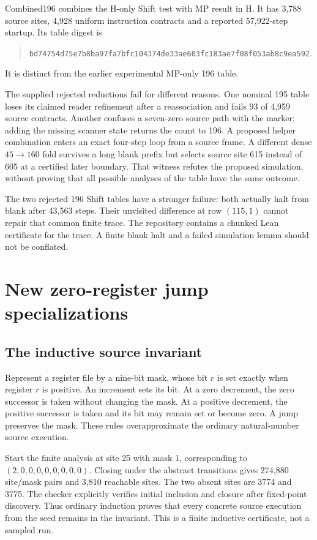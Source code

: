 \documentclass[11pt,a4paper]{article}
\begin{document}
Combined196 combines the H-only Shift test with MP result in H. It has
3,788 source sites, 4,928 uniform instruction contracts and a reported
57,922-step startup. Its table digest is
\begin{quote}\small
\nolinkurl{bd74754d75e7b8ba97fa7bfc104374de33ae603fc183ae7f08f053ab8c9ea592}.
\end{quote}
It is distinct from the earlier experimental MP-only 196 table.

The supplied rejected reductions fail for different reasons. One nominal
195 table loses its claimed reader refinement after a reassociation and
fails 93 of 4,959 source contracts. Another confuses a seven-zero source
path with the marker; adding the missing scanner state returns the count
to 196. A proposed helper combination enters an exact four-step loop from
a source frame. A different dense $45\to160$ fold survives a long blank
prefix but selects source site 615 instead of 605 at a certified later
boundary. That witness refutes the proposed simulation, without proving
that all possible analyses of the table have the same outcome.

The two rejected 196 Shift tables have a stronger failure: both actually
halt from blank after 43,563 steps. Their unvisited difference at row
$(115,1)$ cannot repair that common finite trace. The repository contains
a chunked Lean certificate for the trace. A finite blank halt and a failed
simulation lemma should not be conflated.

\section{New zero-register jump specializations}
\label{sec:jumps}

\subsection{The inductive source invariant}

Represent a register file by a nine-bit mask, whose bit $r$ is set exactly
when register $r$ is positive. An increment sets its bit. At a zero
decrement, the zero successor is taken without changing the mask. At a
positive decrement, the positive successor is taken and its bit may remain
set or become zero. A jump preserves the mask. These rules overapproximate
the ordinary natural-number source execution.

Start the finite analysis at site 25 with mask 1, corresponding to
$(2,0,0,0,0,0,0,0,0)$. Closing under the abstract transitions gives
274,880 site/mask pairs and 3,810 reachable sites. The two absent sites
are 3774 and 3775. The checker explicitly verifies initial inclusion and
closure after fixed-point discovery. Thus ordinary induction proves that
every concrete source execution from the seed remains in the invariant.
This is a finite inductive certificate, not a sampled run.
\end{document}
